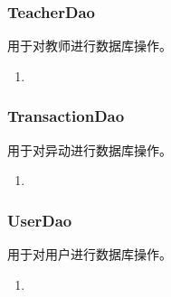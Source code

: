 \documentclass[../report.tex]{subfiles}
\begin{document}
\subsubsection{TeacherDao}
用于对教师进行数据库操作。
\begin{enumerate}
\itemsep 0em
\item 
\end{enumerate}
\subsubsection{TransactionDao}
用于对异动进行数据库操作。
\begin{enumerate}
\itemsep 0em
\item 
\end{enumerate}
\subsubsection{UserDao}
用于对用户进行数据库操作。
\begin{enumerate}
\itemsep 0em
\item 
\end{enumerate}
\end{document}

